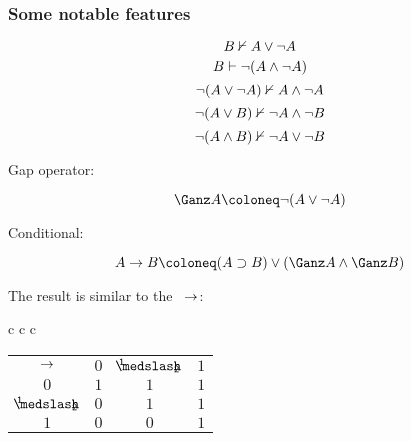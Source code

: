 \documentclass[11pt]{article}
\begin{document}
\subsubsection*{Some notable features}

\[ {B}\nvdash{A \vee \neg A} \]
\[ {B}\vdash{\neg(A \wedge \neg A)} \]
\[ {\neg(A\vee\neg A)}\nvdash{A\wedge\neg A} \]
\[ {\neg(A \vee B)}\nvdash{\neg A \wedge \neg B} \]
\[ {\neg(A \wedge B)}\nvdash{\neg A \vee \neg B} \]

\noindent Gap operator:

\[ \Gap A \Defined \neg (A \vee \neg A) \]

\noindent Conditional:

\[A\arrow B \Defined (A\supset B)\vee(\Gap A \wedge \Gap B)\]

\noindent The result is similar to the \Luk\ $\rightarrow$:

\begin{longtable}{c c c}
\begin{tabular}{c | c c c}
$\rightarrow$ & $0$ & $\oneHalf$ & $1$ \\
\cline{1-4} 
$0$ & $1$ & $1$ & $1$ \\
$\oneHalf$ & $0$ & $1$ & $1$ \\
$1$ & $0$ & $0$ & $1$ \\
\end{tabular}
\end{longtable}
\end{document}
